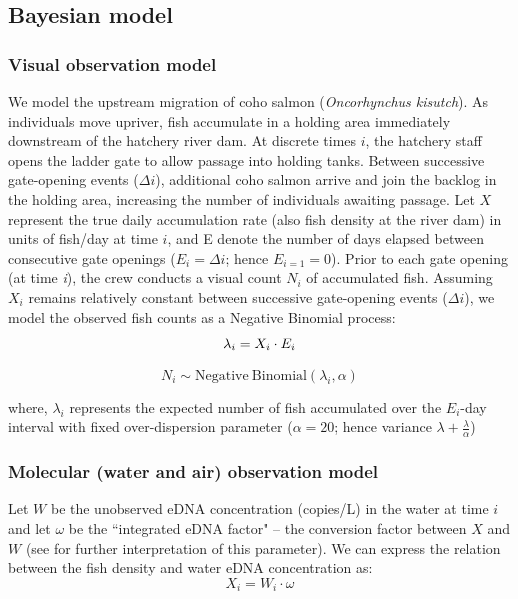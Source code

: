 \documentclass{article}
\begin{document}
\subsection{Bayesian model}
\subsubsection{Visual observation model}
We model the upstream migration of coho salmon (\textit{Oncorhynchus kisutch}). As individuals move upriver, fish accumulate in a holding area immediately downstream of the hatchery river dam. At discrete times $i$, the hatchery staff opens the ladder gate to allow passage into holding tanks. Between successive gate-opening events ($\Delta i$), additional coho salmon arrive and join the backlog in the holding area, increasing the number of individuals awaiting passage. Let $X$ represent the true daily accumulation rate (also fish density at the river dam) in units of fish/day at time $i$, and E denote the number of days elapsed between consecutive gate openings ($ E_i =\Delta i$; hence $ E_{i=1} = 0$). Prior to each gate opening (at time \textit{i}), the crew conducts a visual count $N_i$ of accumulated fish. Assuming $X_i$ remains relatively constant between successive gate-opening events ($\Delta i$), we model the observed fish counts as a Negative Binomial process:
\begin{equation}
\lambda_i = X_i \cdot E_i \\
\end{equation}

\begin{equation}
N_i \sim \mathrm{Negative\ Binomial}(\lambda_i, \alpha)
\end{equation} 

where, $\lambda_i$ represents the expected number of fish accumulated over the $E_i$-day interval with fixed over-dispersion parameter ($\alpha =20$; hence variance $\lambda+\frac{\lambda}{\alpha}$) \cite{welch1993,guri2024a}

\subsubsection{Molecular (water and air) observation model}
Let $W$ be the unobserved eDNA concentration (copies/L) in the water at time $i$ and let $\omega$ be the ``integrated eDNA factor" -- the conversion factor between $X$ and $W$ (see \cite{guri2024a} for further interpretation of this parameter). We can express the relation between the fish density and water eDNA concentration as:
\begin{equation}
X_{i} = W_{i} \cdot \omega
\end{equation}
\end{document}

